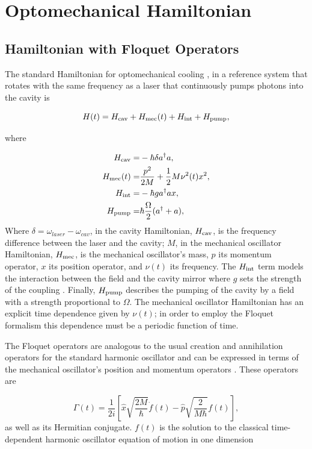 \documentclass[reprint, amsmath,amssymb, aps,pra]{revtex4-1}
\begin{document}
\section{Optomechanical Hamiltonian}\label{OptmechH}
\subsection{Hamiltonian with Floquet Operators}
	
The standard Hamiltonian for optomechanical cooling \cite{LCNooshi}, in
a reference system that rotates with the same frequency as a laser
that continuously pumps photons into the cavity is

\begin{equation}
H(t) =   H_{\rm cav} + H_{\rm mec}(t) + H_{\rm int} + H_{\rm pump},
\end{equation}

where

\begin{align}
H_{\rm cav} =& -\hbar \delta a^\dagger a,\\
H_{\rm mec}(t) =& \frac{p^2}{2M} + \frac{1}{2}M \nu^2 (t) x^2,\\
H_{\rm int} =& -\hbar g a^\dagger a x,\\
H_{\rm pump} =& \hbar\frac{\Omega}{2}(a^\dagger + a),
\end{align}
Where $\delta = \omega_{laser} - \omega_{cav}$, in the cavity Hamiltonian, $H_{\rm cav}$, is the frequency difference between the laser and
the cavity; $M$, in the mechanical oscillator Hamiltonian,
$H_{\rm mec}$, is the mechanical oscillator's mass, $p$ its momentum
operator, $x$ its position operator, and $\nu(t)$ its frequency. The
$H_{\rm int}$ term models the interaction between the field and the cavity
mirror where $g$ sets the strength of the coupling \cite{KippenberCO}.
Finally, $H_{\rm pump}$ describes the pumping of the cavity by a field with
a strength proportional to $\Omega$. The mechanical oscillator Hamiltonian has an explicit time dependence given by
$\nu(t)$; in order to employ the Floquet formalism this dependence must be a
periodic function of time.

The Floquet operators are analogous to the usual creation and
annihilation operators for the standard harmonic oscillator and can be
expressed in terms of the mechanical oscillator's position and
momentum operators \cite{HanngiFM}. These operators are

\begin{equation}\label{FloquetOperators}
\Gamma(t) = \frac{1}{2i}\left[\hat{x}\sqrt{\frac{2M}{\hbar}}\dot{f}(t)-\hat{p}\sqrt{\frac{2}{M \hbar }}f(t)\right],
\end{equation} as well as its Hermitian conjugate. $f(t)$ is the solution to the classical time-dependent harmonic oscillator equation of motion in one dimension 
\end{document}
